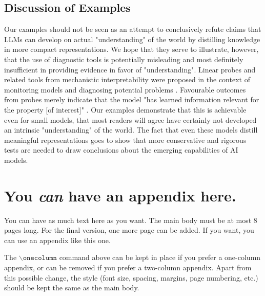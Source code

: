 \documentclass{article}
\theoremstyle{plain}
\theoremstyle{definition}
\theoremstyle{remark}
\begin{document}
\subsection{Discussion of Examples}

Our examples should not be seen as an attempt to conclusively refute claims that LLMs can develop on actual "understanding" of the world by distilling knowledge in more compact representations. We hope that they serve to illustrate, however, that the use of diagnostic tools is potentially misleading and most definitely insufficient in providing evidence in favor of "understanding". Linear probes and related tools from mechanistic interpretability were proposed in the context of monitoring models and diagnosing potential problems \citep{alain2018understanding}. Favourable outcomes from probes merely indicate that the model "has learned information relevant for the property [of interest]" \citep{belinkov2021probing}. Our examples demonstrate that this is achievable even for small models, that most readers will agree have certainly not developed an intrinsic "understanding" of the world. The fact that even these models distill meaningful representations goes to show that more conservative and rigorous tests are needed to draw conclusions about the emerging capabilities of AI models.





\newpage
\appendix
\onecolumn
\section{You \emph{can} have an appendix here.}

You can have as much text here as you want. The main body must be at most $8$ pages long.
For the final version, one more page can be added.
If you want, you can use an appendix like this one.  

The $\mathtt{\backslash onecolumn}$ command above can be kept in place if you prefer a one-column appendix, or can be removed if you prefer a two-column appendix.  Apart from this possible change, the style (font size, spacing, margins, page numbering, etc.) should be kept the same as the main body.
\end{document}
